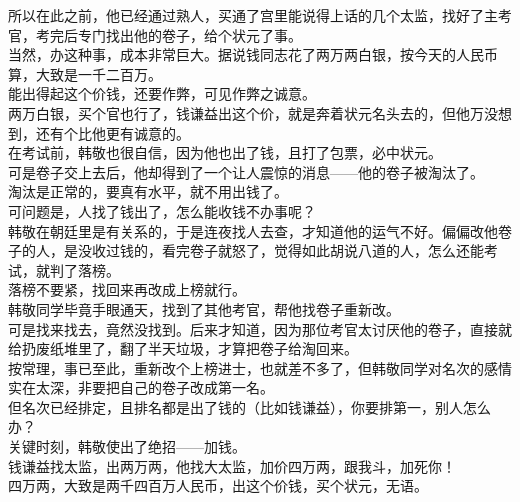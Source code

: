 \begin{multicols}{\theparacolNo}
所以在此之前，他已经通过熟人，买通了宫里能说得上话的几个太监，找好了主考官，考完后专门找出他的卷子，给个状元了事。\\

当然，办这种事，成本非常巨大。据说钱同志花了两万两白银，按今天的人民币算，大致是一千二百万。\\

能出得起这个价钱，还要作弊，可见作弊之诚意。\\

两万白银，买个官也行了，钱谦益出这个价，就是奔着状元名头去的，但他万没想到，还有个比他更有诚意的。\\

在考试前，韩敬也很自信，因为他也出了钱，且打了包票，必中状元。\\

可是卷子交上去后，他却得到了一个让人震惊的消息——他的卷子被淘汰了。\\

淘汰是正常的，要真有水平，就不用出钱了。\\

可问题是，人找了钱出了，怎么能收钱不办事呢？\\

韩敬在朝廷里是有关系的，于是连夜找人去查，才知道他的运气不好。偏偏改他卷子的人，是没收过钱的，看完卷子就怒了，觉得如此胡说八道的人，怎么还能考试，就判了落榜。\\

落榜不要紧，找回来再改成上榜就行。\\

韩敬同学毕竟手眼通天，找到了其他考官，帮他找卷子重新改。\\

可是找来找去，竟然没找到。后来才知道，因为那位考官太讨厌他的卷子，直接就给扔废纸堆里了，翻了半天垃圾，才算把卷子给淘回来。\\

按常理，事已至此，重新改个上榜进士，也就差不多了，但韩敬同学对名次的感情实在太深，非要把自己的卷子改成第一名。\\

但名次已经排定，且排名都是出了钱的（比如钱谦益），你要排第一，别人怎么办？\\

关键时刻，韩敬使出了绝招——加钱。\\

钱谦益找太监，出两万两，他找大太监，加价四万两，跟我斗，加死你！\\

四万两，大致是两千四百万人民币，出这个价钱，买个状元，无语。\\


\end{multicols}
